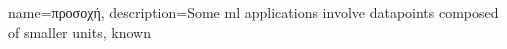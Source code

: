 {name={\foreignlanguage{greek}{προσοχή}}, 
	description={Some \gls{ml} applications involve \gls{datapoint}s composed of smaller units, known 
}}
